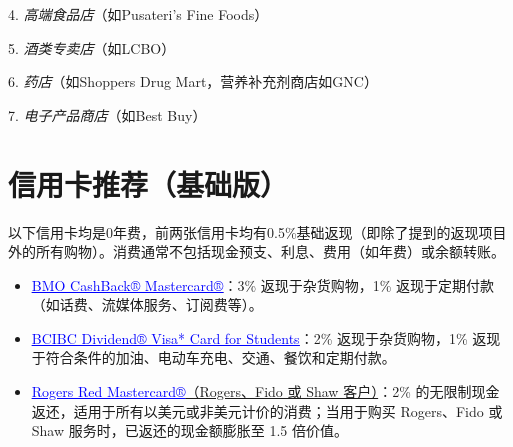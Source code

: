 \documentclass{article}
\begin{document}
4. \emph{高端食品店}（如Pusateri's Fine Foods）

5. \emph{酒类专卖店}（如LCBO）

6. \emph{药店}（如Shoppers Drug Mart，营养补充剂商店如GNC）

7. \emph{电子产品商店}（如Best Buy）

\section{信用卡推荐（基础版）}
以下信用卡均是0年费，前两张信用卡均有0.5\%基础返现（即除了提到的返现项目外的所有购物）。消费通常不包括现金预支、利息、费用（如年费）或余额转账。
\begin{itemize}
    \item \hyperref{https://www.bmo.com/main/personal/credit-cards/student-bmo-cashback-mastercard/}{}{}{\textcolor{blue}{\underline{BMO CashBack® Mastercard®}}}：3\% 返现于杂货购物，1\% 返现于定期付款（如话费、流媒体服务、订阅费等）。
    \item \hyperref{https://www.cibc.com/en/personal-banking/credit-cards/all-credit-cards/dividend-visa-for-students.html}{}{}{\textcolor{blue}{\underline{BCIBC Dividend® Visa* Card for Students}}}：2\% 返现于杂货购物，1\% 返现于符合条件的加油、电动车充电、交通、餐饮和定期付款。
    \item \hyperref{https://www.rogersbank.com/en/rogers_mastercard_details}{}{}{\textcolor{blue}{\underline{Rogers Red Mastercard®}}（Rogers、Fido 或 Shaw 客户）}：2\% 的无限制现金返还，适用于所有以美元或非美元计价的消费；当用于购买 Rogers、Fido 或 Shaw 服务时，已返还的现金额膨胀至 1.5 倍价值。
\end{itemize}
\end{document}
